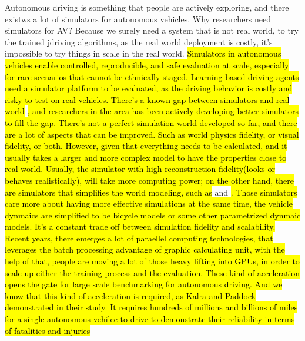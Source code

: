 Autonomous driving is something that people are actively exploring, and there existws a lot of simulators for autonomous vehicles. Why researchers need simulators for AV? Because we surely need a system that is not real world, to try the trained jdriving algorithms, as the real world deployment is costly, it's impossible to try things in scale in the real world.
\hl{Simulators in autonomous vehicles enable controlled, reproducible, and safe evaluation at scale, especially for rare scenarios that cannot be ethnically staged. Learning based driving agents need a simulator platform to be evaluated, as the driving behavior is costly and risky to test on real vehicles. There's a known gap between simulators and real world} \cite{grigorescu_av_survey_2020}\hl{, and researchers in the area has been actively developing better simulators to fill the gap. There's not a perfect simulation world developed so far, and there are a lot of aspects that can be improved. Such as world physics fidelity, or visual fidelity, or both. However, given that everything needs to be calculated, and it usually takes a larger and more complex model to have the properties close to real world. Usually, the simulator with high reconstruction fidelity(looks or behaves realistically), will take more computing power; on the other hand, there are simulators that simplifies the world modeling, such as }\cite{gulino_waymax_2023} and \cite{kazemkhani_gpudrive_2025}\hl{. Those simulators care more about having more effective simulations at the same time, the vehicle dynmaics are simplified to be bicycle models or some other parametrized dynmaic models. It's a constant trade off between simulation fidelity and scalability. Recent years, there emerges a lot of paraellel computing technologies, that leverages the batch processing advantage of graphic calculating unit, with the help of that, people are moving a lot of those heavy lifting into GPUs, in order to scale up either the training process and the evaluation. These kind of acceleration opens the gate for large scale benchmarking for autonomous driving. And we know that this kind of acceleration is required, as Kalra and Paddock demonstrated in their study. It requires hundreds of millions and billions of miles for a single autonomous vehilce to drive to demonstrate their reliability in terms of fatalities and injuries} \cite{kalra_driving_safety_2016}

